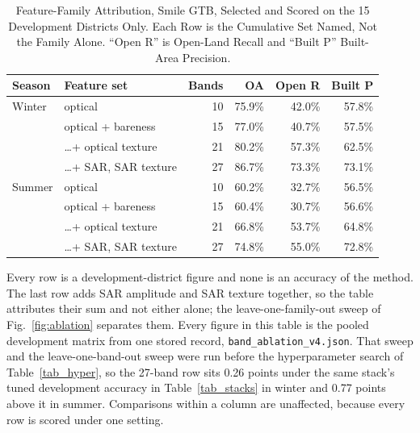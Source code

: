 \documentclass[conference]{IEEEtran}
\begin{document}
\begin{table}[!htbp]
\caption{Feature-Family Attribution, Smile GTB, Selected and Scored on the 15 Development Districts Only. Each Row is the Cumulative Set Named, Not the Family Alone. ``Open R'' is Open-Land Recall and ``Built P'' Built-Area Precision.}
\label{tab_families}
\begin{center}
\setlength{\tabcolsep}{2.5pt}
\begin{tabular}{@{}llrrrr@{}}
\toprule
\textbf{Season} & \textbf{Feature set} & \textbf{Bands} & \textbf{OA} & \textbf{Open R} & \textbf{Built P} \\
\midrule
Winter & optical & 10 & 75.9\% & 42.0\% & 57.8\% \\
       & optical + bareness & 15 & 77.0\% & 40.7\% & 57.5\% \\
       & \dots + optical texture & 21 & 80.2\% & 57.3\% & 62.5\% \\
       & \dots + SAR, SAR texture & 27 & 86.7\% & 73.3\% & 73.1\% \\
\midrule
Summer & optical & 10 & 60.2\% & 32.7\% & 56.5\% \\
       & optical + bareness & 15 & 60.4\% & 30.7\% & 56.6\% \\
       & \dots + optical texture & 21 & 66.8\% & 53.7\% & 64.8\% \\
       & \dots + SAR, SAR texture & 27 & 74.8\% & 55.0\% & 72.8\% \\
\bottomrule
\end{tabular}

\vspace{2pt}
\parbox{\columnwidth}{\footnotesize Every row is a development-district figure and none is an accuracy of the method. The last row adds SAR amplitude and SAR texture together, so the table attributes their sum and not either alone; the leave-one-family-out sweep of Fig.~\ref{fig:ablation} separates them. Every figure in this table is the pooled development matrix from one stored record, \texttt{band\_ablation\_v4.json}. That sweep and the leave-one-band-out sweep were run before the hyperparameter search of Table~\ref{tab_hyper}, so the 27-band row sits 0.26 points under the same stack's tuned development accuracy in Table~\ref{tab_stacks} in winter and 0.77 points above it in summer. Comparisons within a column are unaffected, because every row is scored under one setting.}
\end{center}
\end{table}
\end{document}
